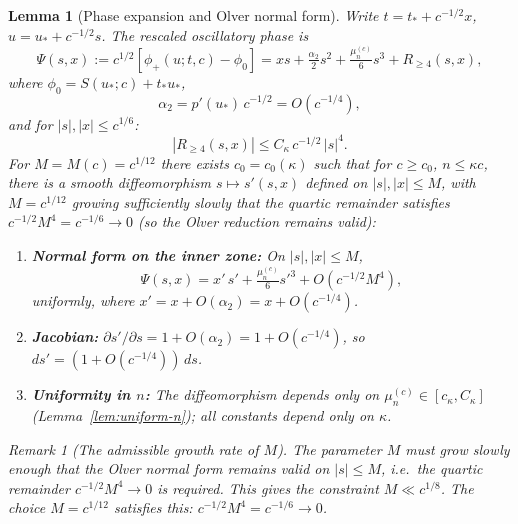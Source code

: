 \documentclass[12pt,a4paper]{amsart}
\newtheorem{lemma}[theorem]{Lemma}
\theoremstyle{definition}
\theoremstyle{remark}
\newtheorem{remark}[theorem]{Remark}
\newcommand{\ustar}{u_*}
\newcommand{\tstar}{t_*}
\begin{document}
\begin{lemma}[Phase expansion and Olver normal form]
\label{lem:phase}
Write $t = \tstar + c^{-1/2}x$,
$u = \ustar + c^{-1/2}s$.
The rescaled oscillatory phase is
\begin{equation}
\label{eq:phase-expand}
  \Psi(s,x) := c^{1/2}[\phi_+(u;t,c) - \phi_0]
  = xs + \tfrac{\alpha_2}{2}s^2
    + \tfrac{\mu_n^{(c)}}{6}s^3
    + R_{\ge 4}(s,x),
\end{equation}
where $\phi_0 = S(\ustar;c) + \tstar\ustar$,
\[
  \alpha_2 = p'(\ustar)\,c^{-1/2} = O(c^{-1/4}),
\]
and for $|s|, |x| \le c^{1/6}$:
\begin{equation}
\label{eq:R4-bound}
  |R_{\ge 4}(s,x)| \le C_\kappa\,c^{-1/2}\,|s|^4.
\end{equation}
For $M = M(c) = c^{1/12}$ there exists
$c_0 = c_0(\kappa)$ such that for
$c \ge c_0$, $n \le \kappa c$,
there is a smooth diffeomorphism
$s \mapsto s'(s,x)$ defined on $|s|, |x| \le M$,
with $M = c^{1/12}$ growing sufficiently slowly
that the quartic remainder satisfies
$c^{-1/2}M^4 = c^{-1/6} \to 0$
(so the Olver reduction remains valid):
\begin{enumerate}[\rm(i)]
  \item \textbf{Normal form on the inner zone:}
        On $|s|, |x| \le M$,
        \[
          \Psi(s,x) = x'\,s'
          + \tfrac{\mu_n^{(c)}}{6}s'^3
          + O(c^{-1/2}M^4),
        \]
        uniformly,
        where $x' = x + O(\alpha_2) = x + O(c^{-1/4})$.
  \item \textbf{Jacobian:}
        $\partial s'/\partial s = 1 + O(\alpha_2)
        = 1 + O(c^{-1/4})$,
        so $ds' = (1 + O(c^{-1/4}))\,ds$.
  \item \textbf{Uniformity in $n$:}
        The diffeomorphism depends only on
        $\mu_n^{(c)} \in [c_\kappa, C_\kappa]$
        \textup{(Lemma~\ref{lem:uniform-n})};
        all constants depend only on $\kappa$.
\end{enumerate}

\begin{remark}[The admissible growth rate of $M$]
\label{rem:M-fixed}
The parameter $M$ must grow slowly enough
that the Olver normal form remains valid
on $|s| \le M$, i.e.\ the quartic remainder
$c^{-1/2}M^4 \to 0$ is required.
This gives the constraint $M \ll c^{1/8}$.
The choice $M = c^{1/12}$ satisfies this:
$c^{-1/2}M^4 = c^{-1/6} \to 0$. \checkmark


\end{remark}
\end{lemma}
\end{document}
